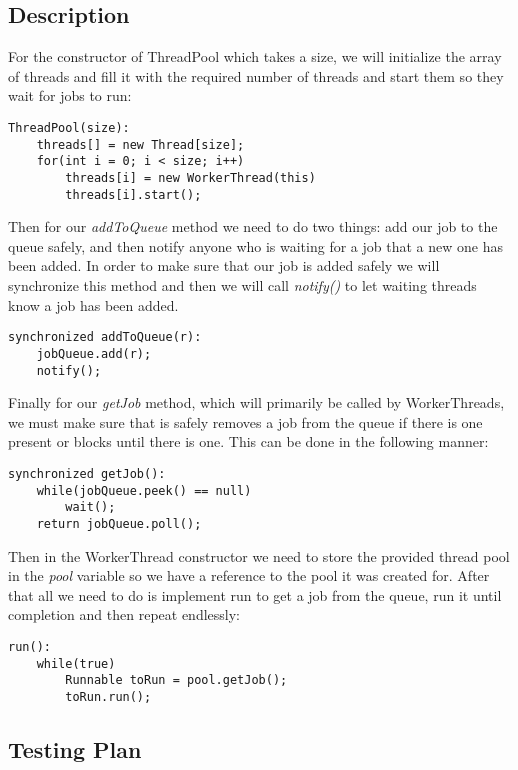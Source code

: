 \documentclass{article}
\begin{document}
\subsection*{Description}

For the constructor of ThreadPool which takes a size, we will initialize the array of threads and fill it with the
required number of threads and start them so they wait for jobs to run:
\begin{verbatim}
ThreadPool(size):
    threads[] = new Thread[size];
    for(int i = 0; i < size; i++)
        threads[i] = new WorkerThread(this)
        threads[i].start();
\end{verbatim}

Then for our \textit{addToQueue} method we need to do two things: add our job to the queue safely, and then notify anyone
who is waiting for a job that a new one has been added. In order to make sure that our job is added safely we will synchronize
this method and then we will call \textit{notify()} to let waiting threads know a job has been added.
\begin{verbatim}
synchronized addToQueue(r):
    jobQueue.add(r);
    notify();
\end{verbatim}

Finally for our \textit{getJob} method, which will primarily be called by WorkerThreads, we must make sure that is safely removes
a job from the queue if there is one present or blocks until there is one. This can be done in the following manner:
\begin{verbatim}
synchronized getJob():
    while(jobQueue.peek() == null)
        wait();
    return jobQueue.poll();
\end{verbatim}

Then in the WorkerThread constructor we need to store the provided thread pool in the \textit{pool} variable so we have a reference
to the pool it was created for. After that all we need to do is implement run to get a job from the queue, run it until completion
and then repeat endlessly:
\begin{verbatim}
run():
    while(true)
        Runnable toRun = pool.getJob();
        toRun.run();
\end{verbatim}


\subsection*{Testing Plan}
\end{document}
